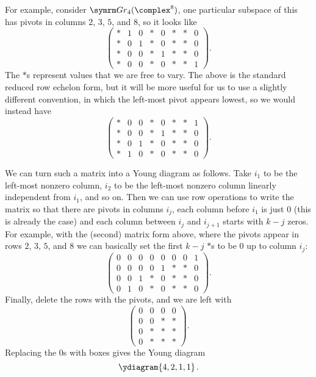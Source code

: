 For example, consider \(\Gr_4(\complex^8)\), one particular subspace of this has pivots in columns \(2\), \(3\), \(5\), and \(8\), so it looks like
\begin{equation}
    \begin{pmatrix}
        * & 1 & 0 & * & 0 & * & * & 0\\
        * & 0 & 1 & * & 0 & * & * & 0\\
        * & 0 & 0 & * & 1 & * & * & 0\\
        * & 0 & 0 & * & 0 & * & * & 1
    \end{pmatrix}
    .
\end{equation}
The \(*\)s represent values that we are free to vary.
The above is the standard reduced row echelon form, but it will be more useful for us to use a slightly different convention, in which the left-most pivot appears lowest, so we would instead have
\begin{equation}
    \begin{pmatrix}
        * & 0 & 0 & * & 0 & * & * & 1\\
        * & 0 & 0 & * & 1 & * & * & 0\\
        * & 0 & 1 & * & 0 & * & * & 0\\
        * & 1 & 0 & * & 0 & * & * & 0
    \end{pmatrix}
    .
\end{equation}

We can turn such a matrix into a Young diagram as follows.
Take \(i_1\) to be the left-most nonzero column, \(i_2\) to be the left-most nonzero column linearly independent from \(i_1\), and so on.
Then we can use row operations to write the matrix so that there are pivots in columns \(i_j\), each column before \(i_1\) is just \(0\) (this is already the case) and each column between \(i_j\) and \(i_{j+1}\) starts with \(k - j\) zeros.
For example, with the (second) matrix form above, where the pivots appear in rows \(2\), \(3\), \(5\), and \(8\) we can basically set the first \(k - j\) \(*\)s to be \(0\) up to column \(i_j\):
\begin{equation}
    \begin{pmatrix}
        0 & 0 & 0 & 0 & 0 & 0 & 0 & 1\\
        0 & 0 & 0 & 0 & 1 & * & * & 0\\
        0 & 0 & 1 & * & 0 & * & * & 0\\
        0 & 1 & 0 & * & 0 & * & * & 0
    \end{pmatrix}
    .
\end{equation}
Finally, delete the rows with the pivots, and we are left with
\begin{equation}
    \begin{pmatrix}
        0 & 0 & 0 & 0\\
        0 & 0 & * & *\\
        0 & * & * & *\\
        0 & * & * & *
    \end{pmatrix}
    .
\end{equation}
Replacing the \(0\)s with boxes gives the Young diagram
\begin{equation}
    \ydiagram{4,2,1,1}\,.
\end{equation}

